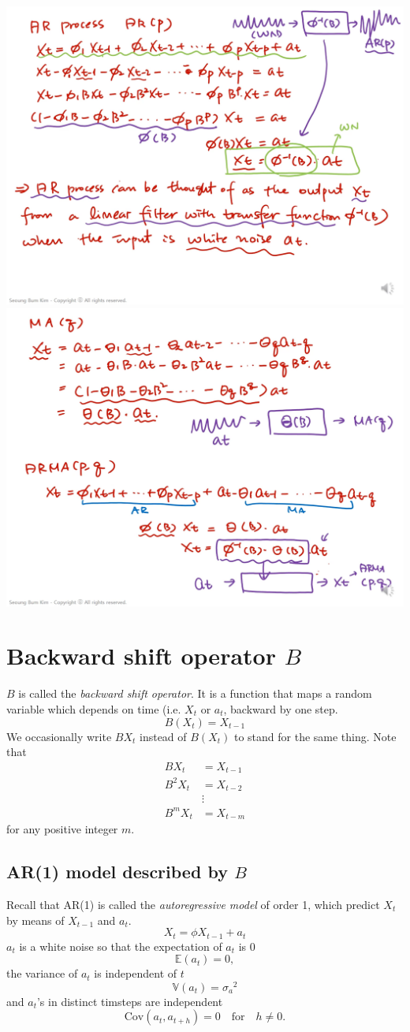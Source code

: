 \documentclass{article}
\newcommand\ar{\ensuremath{\text{AR}}}
\newcommand\cov{\ensuremath{\text{Cov}}}
\begin{document}
\begin{center}
\includegraphics[width=.45\textwidth]{capture6}
\includegraphics[width=.45\textwidth]{capture7}
\end{center}

\section{Backward shift operator \(B\)}
\(B\) is called the \emph{backward shift operator}.
It is a function that maps a random variable which depends on time (i.e. \(X_t\) or \(a_t\), backward by one step.
\begin{equation}\label{bso}
B(X_t)=X_{t-1}
\end{equation}
We occasionally write \(B X_t\) instead of \(B(X_t)\) to stand for the same thing.
Note that
\begin{align*}
B X_t &= X_{t-1}\\
B^2 X_t &= X_{t-2}\\
&\vdots\\
B^m X_t&=X_{t-m}
\end{align*}
for any positive integer \(m\).

%
\subsection{AR(1) model described by \(B\)}
Recall that \ar(1) is called the \emph{autoregressive model} of order 1, which predict \(X_t\) by means of \(X_{t-1}\) and \(a_t\).
\begin{equation}\label{ar1}
X_t=\phi X_{t-1}+a_t
\end{equation}
\(a_t\) is a white noise so that the expectation of \(a_t\) is 0
\begin{equation}\label{white_noise_1}
\mathbb E(a_t)=0,
\end{equation}
the variance of \(a_t\) is independent of \(t\)
\begin{equation}\label{white_noise_2}
\mathbb V(a_t)={\sigma_a}^2
\end{equation}
and \(a_t\)'s in distinct timsteps are independent
\begin{equation}\label{white_noise_3}
\cov(a_t,a_{t+h})=0\quad\text{for}\quad h\neq0.
\end{equation}
\end{document}
